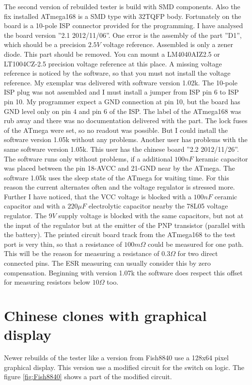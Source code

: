 The second version of rebuilded tester is build with SMD components. Also the fix installed ATmega168
is a SMD type with 32TQFP body.
Fortunately on the board is a 10-pole ISP connector provided for the programming.
I have analysed the board version ''2.1 2012/11/06''. One error is the assembly of the part ''D1'',
which should be a precision \(2.5V\) voltage reference. Assembled is only a zener diode.
This part should be removed. You can mount a LM4040AIZ2.5 or LT1004CZ-2.5 precision voltage reference
at this place. A missing voltage reference is noticed by the software, so that you must not install
the voltage reference.
My exemplar was delivered with software version 1.02k. The 10-pole ISP plug was not assembled and I must
install a jumper from ISP pin 6 to ISP pin 10. My programmer expect a GND connection at pin 10, but the
board has GND level only on pin 4 and pin 6 of the ISP.
The label of the ATmega168 was rub away and there was no documentation delivered with the part.
The lock fuses of the ATmega were set, so no readout was possible.
But I could install the software version 1.05k without any problems.
Another user has problems with the same software version 1.05k. This user has the chinese board ''2.2 2012/11/26''.
The software runs only without problems, if a additional \(100nF\) keramic capacitor was placed between
the pin 18-AVCC and 21-GND near by the ATmega.
The software 1.05k uses the sleep state of the ATmega for waiting time. For this reason the current alternates
often and the voltage regulator is stressed more.
Further I have noticed, that the VCC voltage is blocked with a \(100nF\) ceramic capacitor and with a
\(220\mu F\) electrolytic capacitor nearby the 78L05 voltage regulator.
The \(9V\) supply voltage is blocked with the same capacitors, but not at the input of the regulator but
at the emitter of the PNP transistor (parallel with the battery). 
The printed circuit board track from the ATmega168 to the test port is very thin, so that a resistance
of \(100m\Omega\) could be measured for one path. This will be the reason for measuring a resistance
of \(0.3\Omega\) for two direct connected pins.
The ESR measuring can usually consider this by zero compensation.
Beginning with version 1.07k  the software does respect this offset for measuring resistors below \(10\Omega\) too.

\section{Chinese clones with graphical display}
Newer rebuilds of the tester like a version from Fish8840  use a 128x64 pixel graphical display.
This version use a modified circuit for the switch on logic. 
The figure \ref{fig:Fish8840} shows a part of the modified circuit.

